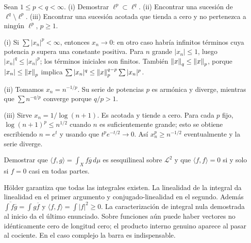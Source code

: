 \begin{ejercicio}\label{ej:v2-l18-5}
Sean $1\le p<q<\infty$. (i) Demostrar $\ell^p\subset\ell^q$. (ii) Encontrar una sucesión de $\ell^q\setminus\ell^p$. (iii) Encontrar una sucesión acotada que tienda a cero y no pertenezca a ningún $\ell^p$, $p\ge1$.
\end{ejercicio}
\begin{solucion}
(i) Si $\sum|x_n|^p<\infty$, entonces $x_n\to0$: en otro caso habría infinitos términos cuya potencia $p$ supera una constante positiva. Para $n$ grande $|x_n|\le1$, luego $|x_n|^q\le|x_n|^p$; los términos iniciales son finitos. También $\left\lVert x\right\rVert_q\le\left\lVert x\right\rVert_p$, porque $|x_n|\le\left\lVert x\right\rVert_p$ implica $\sum|x_n|^q\le\left\lVert x\right\rVert_p^{q-p}\sum|x_n|^p$.

(ii) Tomamos $x_n=n^{-1/p}$. Su serie de potencias $p$ es armónica y diverge, mientras que $\sum n^{-q/p}$ converge porque $q/p>1$.

(iii) Sirve $x_n=1/\log(n+1)$. Es acotada y tiende a cero. Para cada $p$ fijo, $\log(n+1)^p\le n^{1/2}$ cuando $n$ es suficientemente grande; esto se obtiene escribiendo $n=e^t$ y usando que $t^p e^{-t/2}\to0$. Así $x_n^p\ge n^{-1/2}$ eventualmente y la serie diverge.
\end{solucion}

\begin{ejercicio}\label{ej:v2-l18-6}
Demostrar que $\langle f,g\rangle=\int_X f\overline g\,d\mu$ es sesquilineal sobre $\mathcal L^2$ y que $\langle f,f\rangle=0$ si y solo si $f=0$ casi en todas partes.
\end{ejercicio}
\begin{solucion}
Hölder garantiza que todas las integrales existen. La linealidad de la integral da linealidad en el primer argumento y conjugado-linealidad en el segundo. Además $\overline{\int f\overline g}=\int g\overline f$ y $\langle f,f\rangle=\int|f|^2\ge0$. La caracterización de integral nula demostrada al inicio da el último enunciado. Sobre funciones aún puede haber vectores no idénticamente cero de longitud cero; el producto interno genuino aparece al pasar al cociente. En el caso complejo la barra es indispensable.
\end{solucion}


